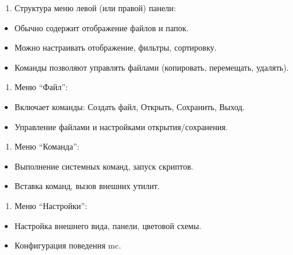 \documentclass[
  english,
  russian,
  12pt,
  a4paper,
  DIV=11,
  numbers=noendperiod]{scrreprt}
\providecommand{\tightlist}{%
  \setlength{\itemsep}{0pt}\setlength{\parskip}{0pt}}
\begin{document}
\begin{enumerate}
\def\labelenumi{\arabic{enumi}.}
\setcounter{enumi}{2}
\tightlist
\item
  Структура меню левой (или правой) панели:
\end{enumerate}

\begin{itemize}
\tightlist
\item
  Обычно содержит отображение файлов и папок.
\item
  Можно настраивать отображение, фильтры, сортировку.
\item
  Команды позволяют управлять файлами (копировать, перемещать, удалять).
\end{itemize}

\begin{enumerate}
\def\labelenumi{\arabic{enumi}.}
\setcounter{enumi}{3}
\tightlist
\item
  Меню \enquote{Файл}:
\end{enumerate}

\begin{itemize}
\tightlist
\item
  Включает команды: Создать файл, Открыть, Сохранить, Выход.
\item
  Управление файлами и настройками открытия/сохранения.
\end{itemize}

\begin{enumerate}
\def\labelenumi{\arabic{enumi}.}
\setcounter{enumi}{4}
\tightlist
\item
  Меню \enquote{Команда}:
\end{enumerate}

\begin{itemize}
\tightlist
\item
  Выполнение системных команд, запуск скриптов.
\item
  Вставка команд, вызов внешних утилит.
\end{itemize}

\begin{enumerate}
\def\labelenumi{\arabic{enumi}.}
\setcounter{enumi}{5}
\tightlist
\item
  Меню \enquote{Настройки}:
\end{enumerate}

\begin{itemize}
\tightlist
\item
  Настройка внешнего вида, панели, цветовой схемы.
\item
  Конфигурация поведения mc.
\end{itemize}
\end{document}
